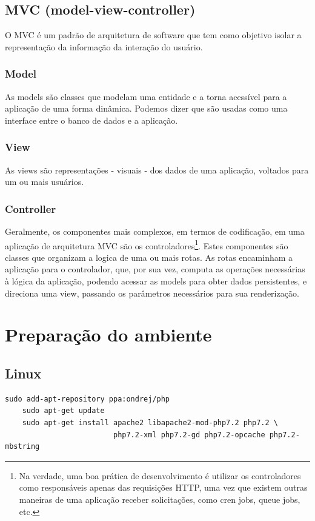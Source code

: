 \documentclass[
12pt,				%
openany,			%
twoside,			%
a4paper,			%
english,			%
french,				%
spanish,			%
brazil,				%
]{abntex2}
\begin{document}
\subsection{MVC (model-view-controller)}
O MVC é um padrão de arquitetura de software que tem como objetivo isolar a
representação da informação da interação do usuário.

\subsubsection{Model}
As models são classes que modelam uma entidade e a torna acessível para a aplicação de
uma forma dinâmica. Podemos dizer que são usadas como uma interface entre o banco de
dados e a aplicação.
\subsubsection{View}
As views são representações - visuais - dos dados de uma aplicação, voltados para um ou
mais usuários.
\subsubsection{Controller}
Geralmente, os componentes mais complexos, em termos de codificação, em uma aplicação
de arquitetura MVC são os controladores\footnote{ Na verdade, uma boa prática de desenvolvimento é utilizar os controladores como responsáveis
    apenas das requisições HTTP, uma vez que existem outras maneiras de uma aplicação receber
solicitações, como cren jobs, queue jobs, etc.}. Estes componentes são classes que organizam a
logica de uma ou mais rotas. As rotas encaminham a aplicação para o controlador, que, por
sua vez, computa as operações necessárias à lógica da aplicação, podendo acessar as models
para obter dados persistentes, e direciona uma view, passando os parâmetros necessários
para sua renderização.

\section{Preparação do ambiente}
\subsection{Linux}

\begin{lstlisting}[style=bash,caption={Instalando Apache e PHP 7.2}]
    sudo add-apt-repository ppa:ondrej/php
    sudo apt-get update
    sudo apt-get install apache2 libapache2-mod-php7.2 php7.2 \
                         php7.2-xml php7.2-gd php7.2-opcache php7.2-mbstring
\end{lstlisting}
\end{document}
